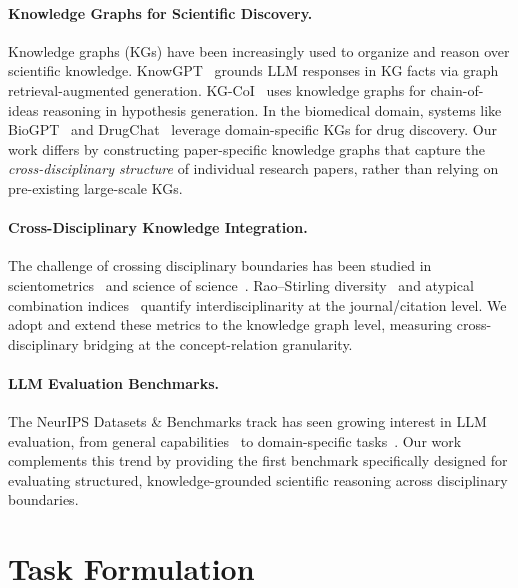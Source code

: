 \documentclass{article}
\begin{document}
\paragraph{Knowledge Graphs for Scientific Discovery.}
Knowledge graphs (KGs) have been increasingly used to organize and reason over scientific knowledge.
KnowGPT~\cite{luo2024knowgpt} grounds LLM responses in KG facts via graph retrieval-augmented generation.
KG-CoI~\cite{li2024chain} uses knowledge graphs for chain-of-ideas reasoning in hypothesis generation.
In the biomedical domain, systems like BioGPT~\cite{luo2022biogpt} and DrugChat~\cite{liang2023drugchat} leverage domain-specific KGs for drug discovery.
Our work differs by constructing paper-specific knowledge graphs that capture the \emph{cross-disciplinary structure} of individual research papers, rather than relying on pre-existing large-scale KGs.

\paragraph{Cross-Disciplinary Knowledge Integration.}
The challenge of crossing disciplinary boundaries has been studied in scientometrics~\cite{stirling2007general,uzzi2013atypical} and science of science~\cite{foster2015tradition}.
Rao--Stirling diversity~\cite{stirling2007general} and atypical combination indices~\cite{uzzi2013atypical} quantify interdisciplinarity at the journal/citation level.
We adopt and extend these metrics to the knowledge graph level, measuring cross-disciplinary bridging at the concept-relation granularity.

\paragraph{LLM Evaluation Benchmarks.}
The NeurIPS Datasets \& Benchmarks track has seen growing interest in LLM evaluation, from general capabilities~\cite{liang2022holistic} to domain-specific tasks~\cite{sun2024scieval}.
Our work complements this trend by providing the first benchmark specifically designed for evaluating structured, knowledge-grounded scientific reasoning across disciplinary boundaries.

\section{Task Formulation}
\label{sec:task}
\end{document}
